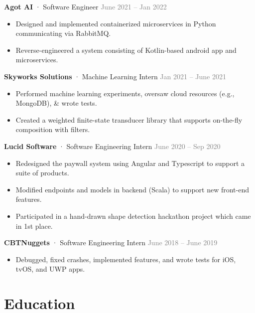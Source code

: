 \documentclass[11pt]{article} %
\providecommand{\tightlist}{%
  \setlength{\itemsep}{0pt}\setlength{\parskip}{3pt}}
\def\separator{ · {}}
\newcommand{\experience}[3]{%
  \vspace{5pt}%
  \textbf{#1}\separator#2\hfill%
  \textcolor{gray}{#3}%
}
\begin{document}
\begin{paracol}{2}
\begin{raggedright}
\experience{Agot AI}{Software Engineer}{June 2021 -- Jan 2022}

\begin{itemize}
\tightlist
\item
  Designed and implemented containerized microservices in Python
  communicating via RabbitMQ.
\item
  Reverse-engineered a system consisting of Kotlin-based android app and
  microservices.
\end{itemize}

\experience{Skyworks Solutions}{Machine Learning Intern}{Jan 2021 -- June 2021}

\begin{itemize}
\tightlist
\item
  Performed machine learning experiments, oversaw cloud resources (e.g.,
  MongoDB), \& wrote tests.
\item
  Created a weighted finite-state transducer library that supports
  on-the-fly composition with filters.
\end{itemize}

\experience{Lucid Software}{Software Engineering Intern}{June 2020 -- Sep 2020}

\begin{itemize}
\tightlist
\item
  Redesigned the paywall system using Angular and Typescript to support
  a suite of products.
\item
  Modified endpoints and models in backend (Scala) to support new
  front-end features.
\item
  Participated in a hand-drawn shape detection hackathon project which
  came in 1st place.
\end{itemize}

\experience{CBTNuggets}{Software Engineering Intern}{June 2018 -- June 2019}

\begin{itemize}
\tightlist
\item
  Debugged, fixed crashes, implemented features, and wrote tests for
  iOS, tvOS, and UWP apps.
\end{itemize}

\switchcolumn

\hypertarget{education}{%
\section{Education}\label{education}}

\hypertarget{oregon-state-university}{%
}
\end{raggedright}
\end{paracol}
\end{document}
